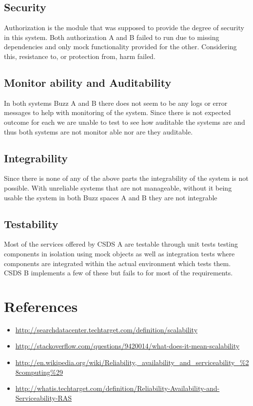 \documentclass[12pt]{article}
\begin{document}
\subsection{Security}
Authorization is the module that was supposed to provide the degree of security in this system. Both authorization A and B  failed to run due to missing dependencies and only mock functionality provided for the other. Considering this, resistance to, or protection from, harm failed.
\subsection{Monitor ability and Auditability}
In both systems Buzz A and B there does not seem to be any logs or error messages to help with monitoring of the system. Since there is not expected outcome for each we are unable to test to see how auditable the systems are and thus both systems are not monitor able nor are they auditable.
\subsection{Integrability}
Since there is none of any of the above parts the integrability of the system is not possible. With unreliable systems that are not manageable, without it being usable the system in both Buzz spaces A and B they are not integrable
\subsection{Testability}
Most of the services offered by CSDS A are testable through unit tests testing components in isolation using mock objects as well as integration tests where components are integrated within the actual environment which tests them. CSDS B implements a few of these but fails to for most of the requirements.

\section{References}
\begin{itemize}
\item \url{http://searchdatacenter.techtarget.com/definition/scalability }
\item \url{http://stackoverflow.com/questions/9420014/what-does-it-mean-scalability}
\item \url{http://en.wikipedia.org/wiki/Reliability,_availability_and_serviceability_%28computing%29}
\item \url{http://whatis.techtarget.com/definition/Reliability-Availability-and-Serviceability-RAS}
\end{itemize}
\end{document}
